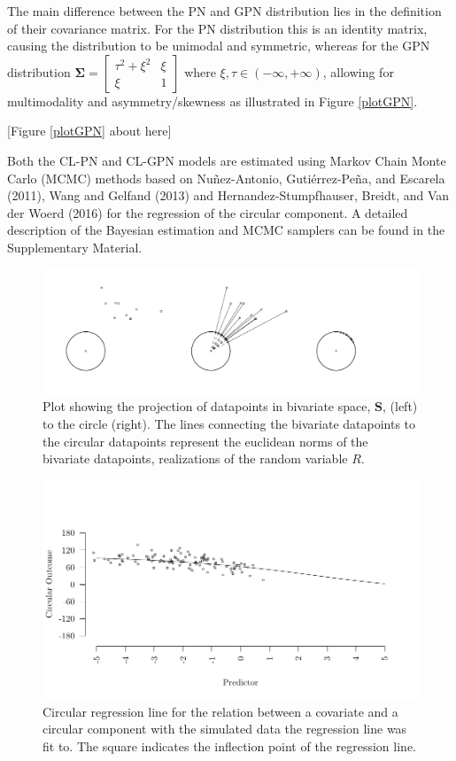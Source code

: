 \documentclass[man,mask]{apa6}
\DeclareRobustCommand{\VANDER}[3]{#2}
\begin{document}
\indent The main difference between the PN and GPN distribution lies in the
definition of their covariance matrix. For the PN distribution this is an
identity matrix, causing the distribution to be unimodal and symmetric, whereas
for the GPN distribution \(\boldsymbol{\Sigma} = \begin{bmatrix} \tau^2 + \xi^2 & \xi\\ \xi & 1 \end{bmatrix}\) where \(\xi,\tau \in (-\infty, +\infty)\),
allowing for multimodality and asymmetry/skewness as illustrated in Figure \ref{plotGPN}.

\hfil [Figure \ref{plotGPN} about here] \hfil

\indent Both the CL-PN and CL-GPN models are estimated using Markov Chain Monte
Carlo (MCMC) methods based on Nuñez-Antonio, Gutiérrez-Peña, and Escarela (2011), Wang and Gelfand (2013) and
Hernandez-Stumpfhauser, Breidt, and \VANDER{Woerd}{Van der}{van der} Woerd (2016) for the regression of the circular component. A detailed
description of the Bayesian estimation and MCMC samplers can be found in the
Supplementary Material.

\begin{figure}
\centering
\includegraphics[width = \textwidth]{Plots/plotprojecting.pdf}
\caption{Plot showing the projection of datapoints in bivariate space, $\boldsymbol{S}$, (left) to the circle (right). The lines connecting the bivariate datapoints to the circular datapoints represent the euclidean norms of the bivariate datapoints, realizations of the random variable $R$.}
\label{projection}
\end{figure}

\begin{figure}[]
  \includegraphics[width = \textwidth]{Plots/circregline.pdf}
  \caption{Circular regression line for the relation between a covariate and a circular component with the simulated data the regression line was fit to. The square indicates the inflection point of the regression line.}
  \label{circregline}
\end{figure}
\end{document}
